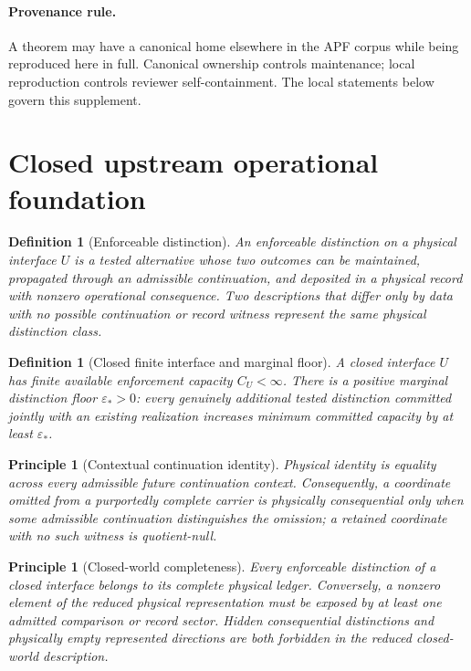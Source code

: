 \documentclass[11pt]{article}
\newtheorem{definition}[theorem]{Definition}
\newtheorem{principle}[theorem]{Principle}
\theoremstyle{remark}
\newcommand{\floor}{\varepsilon_*}
\begin{document}
\paragraph{Provenance rule.}
A theorem may have a canonical home elsewhere in the APF corpus while being reproduced here in full.  Canonical ownership controls maintenance; local reproduction controls reviewer self-containment.  The local statements below govern this supplement.

\section{Closed upstream operational foundation}\label{sec:ts-foundation}

\begin{definition}[Enforceable distinction]\label{def:ts-enforceable-distinction}
An enforceable distinction on a physical interface $U$ is a tested alternative whose two outcomes can be maintained, propagated through an admissible continuation, and deposited in a physical record with nonzero operational consequence.  Two descriptions that differ only by data with no possible continuation or record witness represent the same physical distinction class.
\end{definition}

\begin{definition}[Closed finite interface and marginal floor]\label{def:ts-closed-interface}
A closed interface $U$ has finite available enforcement capacity $C_U<\infty$.  There is a positive marginal distinction floor $\floor>0$: every genuinely additional tested distinction committed jointly with an existing realization increases minimum committed capacity by at least $\floor$.
\end{definition}

\begin{principle}[Contextual continuation identity]\label{pr:ts-contextual-identity}
Physical identity is equality across every admissible future continuation context.  Consequently, a coordinate omitted from a purportedly complete carrier is physically consequential only when some admissible continuation distinguishes the omission; a retained coordinate with no such witness is quotient-null.
\end{principle}

\begin{principle}[Closed-world completeness]\label{pr:ts-closed-world}
Every enforceable distinction of a closed interface belongs to its complete physical ledger.  Conversely, a nonzero element of the reduced physical representation must be exposed by at least one admitted comparison or record sector.  Hidden consequential distinctions and physically empty represented directions are both forbidden in the reduced closed-world description.
\end{principle}
\end{document}
